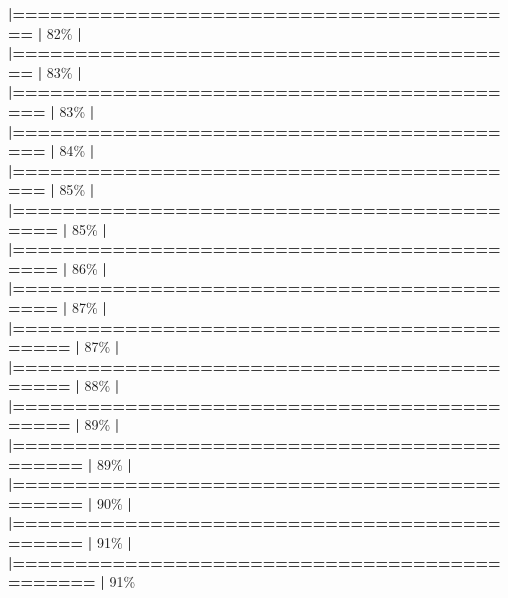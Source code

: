 \documentclass[
]{book}
\newenvironment{Shaded}{\begin{snugshade}}{\end{snugshade}}
\newcommand{\DecValTok}[1]{\textcolor[rgb]{0.00,0.00,0.81}{#1}}
\newcommand{\ErrorTok}[1]{\textcolor[rgb]{0.64,0.00,0.00}{\textbf{#1}}}
\newcommand{\NormalTok}[1]{#1}
\newcommand{\SpecialCharTok}[1]{\textcolor[rgb]{0.81,0.36,0.00}{\textbf{#1}}}
\begin{document}
\begin{Shaded}
\begin{Highlighting}[]
  \ErrorTok{|=========================================}         \ErrorTok{|}  \DecValTok{82}\NormalTok{\%}
  \SpecialCharTok{|}                                                        
  \ErrorTok{|=========================================}         \ErrorTok{|}  \DecValTok{83}\NormalTok{\%}
  \SpecialCharTok{|}                                                        
  \ErrorTok{|==========================================}        \ErrorTok{|}  \DecValTok{83}\NormalTok{\%}
  \SpecialCharTok{|}                                                        
  \ErrorTok{|==========================================}        \ErrorTok{|}  \DecValTok{84}\NormalTok{\%}
  \SpecialCharTok{|}                                                        
  \ErrorTok{|==========================================}        \ErrorTok{|}  \DecValTok{85}\NormalTok{\%}
  \SpecialCharTok{|}                                                        
  \ErrorTok{|===========================================}       \ErrorTok{|}  \DecValTok{85}\NormalTok{\%}
  \SpecialCharTok{|}                                                        
  \ErrorTok{|===========================================}       \ErrorTok{|}  \DecValTok{86}\NormalTok{\%}
  \SpecialCharTok{|}                                                        
  \ErrorTok{|===========================================}       \ErrorTok{|}  \DecValTok{87}\NormalTok{\%}
  \SpecialCharTok{|}                                                        
  \ErrorTok{|============================================}      \ErrorTok{|}  \DecValTok{87}\NormalTok{\%}
  \SpecialCharTok{|}                                                        
  \ErrorTok{|============================================}      \ErrorTok{|}  \DecValTok{88}\NormalTok{\%}
  \SpecialCharTok{|}                                                        
  \ErrorTok{|============================================}      \ErrorTok{|}  \DecValTok{89}\NormalTok{\%}
  \SpecialCharTok{|}                                                        
  \ErrorTok{|=============================================}     \ErrorTok{|}  \DecValTok{89}\NormalTok{\%}
  \SpecialCharTok{|}                                                        
  \ErrorTok{|=============================================}     \ErrorTok{|}  \DecValTok{90}\NormalTok{\%}
  \SpecialCharTok{|}                                                        
  \ErrorTok{|=============================================}     \ErrorTok{|}  \DecValTok{91}\NormalTok{\%}
  \SpecialCharTok{|}                                                        
  \ErrorTok{|==============================================}    \ErrorTok{|}  \DecValTok{91}\NormalTok{\%}

\end{Highlighting}
\end{Shaded}
\end{document}
